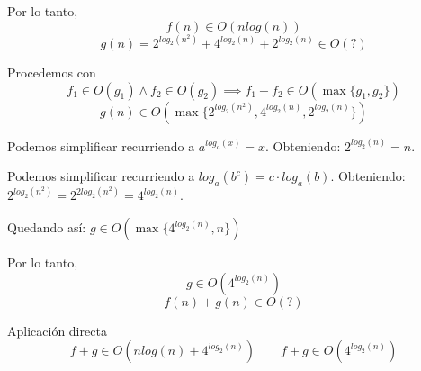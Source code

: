\documentclass{article}
\begin{document}
	Por lo tanto, \[ f(n) \in O(nlog(n))\]
	{\LARGE
	\begin{displaymath}
		g(n) = 2^{log_2 (n^2)} + 4^{log_2 (n)} + 2^{log_2 (n)} \in O(?)
	\end{displaymath}
	}
	
	Procedemos con
	\[
		f_1 \in O(g_1) \land f_2 \in O(g_2) \implies f_1 + f_2 \in O(\max \{g_1, g_2\})
	\]
	\[
		g(n) \in O(\max \{2^{log_2 (n^2)}, 4^{log_2 (n)}, 2^{log_2 (n)}\})
	\]
	
	Podemos simplificar recurriendo a $a^{log_a (x)} = x$. Obteniendo: $2^{log_2 (n)} = n$.
	
	Podemos simplificar recurriendo a $log_a (b^c) = c \cdot log_a (b)$. Obteniendo: $2^{log_2 (n^2)} = 2^{2log_2(n^2)} = 4^{log_2 (n)}$.
	
	Quedando así: $g \in O(\max \{ 4^{log_2 (n)}, n\})$
	
	Por lo tanto,
	\[
		g \in O(4^{log_2 (n)})
	\]
	{\LARGE
	\begin{displaymath}
		f (n) + g(n) \in O(?)
	\end{displaymath}
	}

	Aplicación directa
	\[
		f + g \in O(n log(n) + 4^{log_2 (n)}) \qquad f + g \in O(4^{log_2 (n)})
	\]
\end{document}
